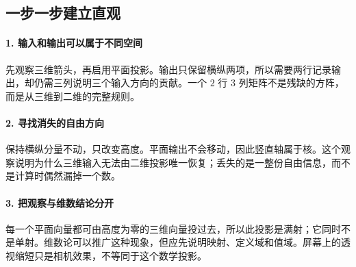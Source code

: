 \subsection*{一步一步建立直观}

\paragraph{1. 输入和输出可以属于不同空间}

先观察三维箭头，再启用平面投影。输出只保留横纵两项，所以需要两行记录输出，却仍需三列说明三个输入方向的贡献。一个 $2$ 行 $3$ 列矩阵不是残缺的方阵，而是从三维到二维的完整规则。



\paragraph{2. 寻找消失的自由方向}

保持横纵分量不动，只改变高度。平面输出不会移动，因此竖直轴属于核。这个观察说明为什么三维输入无法由二维投影唯一恢复；丢失的是一整份自由信息，而不是计算时偶然漏掉一个数。



\paragraph{3. 把观察与维数结论分开}

每一个平面向量都可由高度为零的三维向量投过去，所以此投影是满射；它同时不是单射。维数论可以推广这种现象，但应先说明映射、定义域和值域。屏幕上的透视缩短只是相机效果，不等同于这个数学投影。
